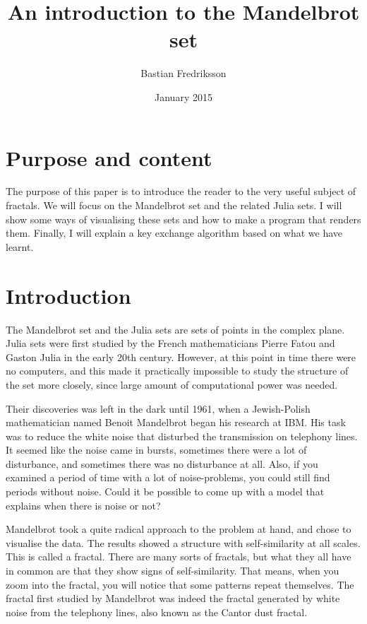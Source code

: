 \documentclass{article}
\title{An introduction to the Mandelbrot set}
\author{Bastian Fredriksson}
\date{January 2015}
\begin{document}
\maketitle

\section{Purpose and content}
The purpose of this paper is to introduce the reader to the very useful subject of fractals. We will focus on the Mandelbrot set and the related Julia sets. I will show some ways of visualising these sets and how to make a program that renders them. Finally, I will explain a key exchange algorithm based on what we have learnt.

\section{Introduction}
The Mandelbrot set and the Julia sets are sets of points in the complex plane. Julia sets were first studied by the French mathematicians Pierre Fatou and Gaston Julia in the early 20th century. However, at this point in time there were no computers, and this made it practically impossible to study the structure of the set more closely, since large amount of computational power was needed. 

Their discoveries was left in the dark until 1961, when a Jewish-Polish mathematician named Benoit Mandelbrot began his research at IBM. His task was to reduce the white noise that disturbed the transmission on telephony lines\cite{ibm}. It seemed like the noise came in bursts, sometimes there were a lot of disturbance, and sometimes there was no disturbance at all. Also, if you examined a period of time with a lot of noise-problems, you could still find periods without noise\cite{pritchard}. Could it be possible to come up with a model that explains when there is noise or not?

Mandelbrot took a quite radical approach to the problem at hand, and chose to visualise the data. The results showed a structure with self-similarity at all scales. This is called a fractal. There are many sorts of fractals, but what they all have in common are that they show signs of self-similarity. That means, when you zoom into the fractal, you will notice that some patterns repeat themselves. The fractal first studied by Mandelbrot was indeed the fractal generated by white noise from the telephony lines, also known as the Cantor dust fractal\cite{weisstein, ibm}.
\end{document}
